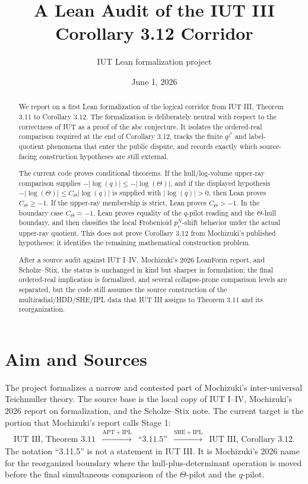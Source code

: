 \documentclass[11pt]{article}
\title{A Lean Audit of the IUT III Corollary 3.12 Corridor}
\author{IUT Lean formalization project}
\date{June 1, 2026}
\newcommand{\IUT}{IUT}
\newcommand{\Lean}{Lean}
\newcommand{\SHE}{\ensuremath{\mathrm{SHE}}}
\newcommand{\IPL}{\ensuremath{\mathrm{IPL}}}
\newcommand{\APT}{\ensuremath{\mathrm{APT}}}
\theoremstyle{plain}
\theoremstyle{definition}
\theoremstyle{remark}
\begin{document}
\maketitle
\sloppy

\begin{abstract}
We report on a first \Lean{} formalization of the logical corridor from
\IUT{} III, Theorem 3.11 to Corollary 3.12.  The formalization is deliberately
neutral with respect to the correctness of \IUT{} as a proof of the abc
conjecture.  It isolates the ordered-real comparison required at the end of
Corollary 3.12, tracks the finite \(q^{j^2}\) and label-quotient phenomena
that enter the public dispute, and records exactly which source-facing
construction hypotheses are still external.

The current code proves conditional theorems.  If the hull/log-volume
upper-ray comparison supplies
\(-|\log(q)|\le -|\log(\Theta)|\), and if the displayed hypothesis
\(-|\log(\Theta)|\le C_\Theta|\log(q)|\) is supplied with
\(|\log(q)|>0\), then \Lean{} proves \(C_\Theta\ge -1\).  If the upper-ray
membership is strict, \Lean{} proves \(C_\Theta>-1\).  In the boundary case
\(C_\Theta=-1\), \Lean{} proves equality of the \(q\)-pilot reading and the
\(\Theta\)-hull boundary, and then classifies the local Frobenioid
\(p_v^N\)-shift behavior under the actual upper-ray quotient.  This does not
prove Corollary 3.12 from Mochizuki's published hypotheses; it identifies the
remaining mathematical construction problem.

After a source audit against \IUT{} I--IV, Mochizuki's 2026 LeanForm report,
and Scholze--Stix, the status is unchanged in kind but sharper in formulation:
the final ordered-real implication is formalized, and several collapse-prone
comparison levels are separated, but the code still assumes the source
construction of the multiradial/HDD/SHE/IPL data that \IUT{} III assigns to
Theorem 3.11 and its reorganization.
\end{abstract}

\section{Aim and Sources}

The project formalizes a narrow and contested part of Mochizuki's
inter-universal Teichmuller theory.  The source base is the local copy of
\IUT{} I--IV, Mochizuki's 2026 report on formalization, and the Scholze--Stix
note.  The current target is the portion that Mochizuki's report calls Stage 1:
\[
\begin{array}{ccccc}
\text{\IUT{} III, Theorem 3.11}
& \xrightarrow{\APT+\IPL} &
\text{``3.11.5''}
& \xrightarrow{\SHE+\IPL} &
\text{\IUT{} III, Corollary 3.12}.
\end{array}
\]
The notation ``3.11.5'' is not a statement in \IUT{} III.  It is Mochizuki's
2026 name for the reorganized boundary where the hull-plus-determinant
operation is moved before the final simultaneous comparison of the
\(\Theta\)-pilot and the \(q\)-pilot.
\end{document}
